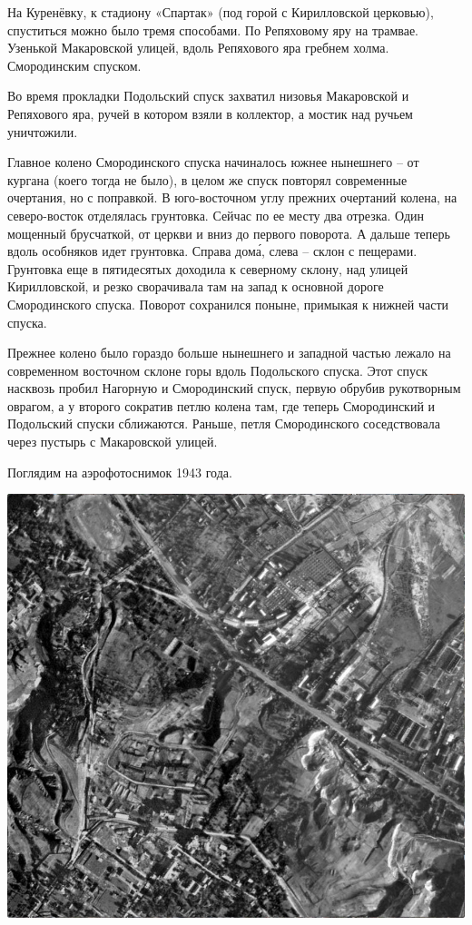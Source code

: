 На Куренёвку, к стадиону «Спартак» (под горой с Кирилловской церковью), спуститься можно было тремя способами. По Репяховому яру на трамвае. Узенькой Макаровской улицей, вдоль Репяхового яра гребнем холма. Смородинским спуском.

Во время прокладки Подольский спуск захватил низовья Макаровской и Репяхового яра, ручей в котором взяли в коллектор, а мостик над ручьем уничтожили. 

Главное колено Смородинского спуска начиналось южнее нынешнего –  от кургана (коего тогда не было), в целом же спуск повторял современные очертания, но с поправкой. В юго-восточном углу прежних очертаний колена, на северо-восток отделялась грунтовка. Сейчас по ее месту два отрезка. Один мощенный брусчаткой, от церкви и вниз до первого поворота. А дальше теперь вдоль особняков идет грунтовка. Справа дом\'а, слева – склон с пещерами. Грунтовка еще в пятидесятых доходила к северному склону, над улицей Кирилловской, и резко сворачивала там на запад к основной дороге Смородинского спуска. Поворот сохранился поныне, примыкая к нижней части спуска.

Прежнее колено было гораздо больше нынешнего и западной частью лежало на современном восточном склоне горы вдоль Подольского спуска. Этот спуск насквозь пробил Нагорную и Смородинский спуск, первую обрубив рукотворным оврагом, а у второго сократив петлю колена там, где теперь Смородинский и Подольский спуски сближаются. Раньше, петля Смородинского соседствовала через пустырь с Макаровской улицей.

Поглядим на аэрофотоснимок 1943 года.

\begin{center}
\includegraphics[width=0.80\linewidth]{chast-zmiy/karta-opis/obsh-map.jpg}
\end{center}

